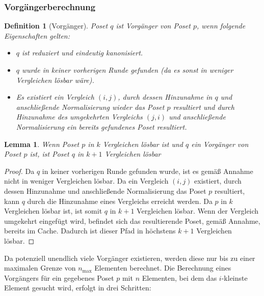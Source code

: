 \documentclass[10pt,journal,compsoc]{IEEEtran}
\newtheorem{lemma}{Lemma}
\newtheorem{definition}{Definition}
\begin{document}
\subsubsection{Vorgängerberechnung} \label{sec:backward:predecessor_calculation}

\begin{definition}[Vorgänger] \label{definition:predecessor_calculation}
  Poset $q$ ist Vorgänger von Poset $p$, wenn folgende Eigenschaften gelten:
  \begin{itemize}
    \item $q$ ist reduziert und eindeutig kanonisiert.
    \item $q$ wurde in keiner vorherigen Runde gefunden (da es sonst in weniger Vergleichen lösbar wäre).
    \item Es existiert ein Vergleich $(i, j)$, durch dessen Hinzunahme in $q$ und anschließende Normalisierung wieder das Poset $p$ resultiert und durch Hinzunahme des umgekehrten Vergleichs $(j, i)$ und anschließende Normalisierung ein bereits gefundenes Poset resultiert.
  \end{itemize}
\end{definition}

\begin{lemma} \label{lemma:predecessor_calculation}
  Wenn Poset $p$ in $k$ Vergleichen lösbar ist und $q$ ein Vorgänger von Poset $p$ ist, ist Poset $q$ in $k + 1$ Vergleichen lösbar
\end{lemma}

\begin{proof} \label{proof:predecessor_calculation}
  Da $q$ in keiner vorherigen Runde gefunden wurde, ist es gemäß Annahme nicht in weniger Vergleichen lösbar.
  Da ein Vergleich $(i, j)$ existiert, durch dessen Hinzunahme und anschließende Normalisierung das Poset $p$ resultiert, kann $q$ durch die Hinzunahme eines Vergleichs erreicht werden.
  Da $p$ in $k$ Vergleichen lösbar ist, ist somit $q$ in $k + 1$ Vergleichen lösbar.
  Wenn der Vergleich umgekehrt eingefügt wird, befindet sich das resultierende Poset, gemäß Annahme, bereits im Cache.
  Dadurch ist dieser Pfad in höchstens $k + 1$ Vergleichen lösbar.
\end{proof}

Da potenziell unendlich viele Vorgänger existieren, werden diese nur bis zu einer maximalen Grenze von $n_{\text{max}}$ Elementen berechnet.
Die Berechnung eines Vorgängers für ein gegebenes Poset $p$ mit $n$ Elementen, bei dem das $i$-kleinste Element gesucht wird, erfolgt in drei Schritten:
\end{document}
